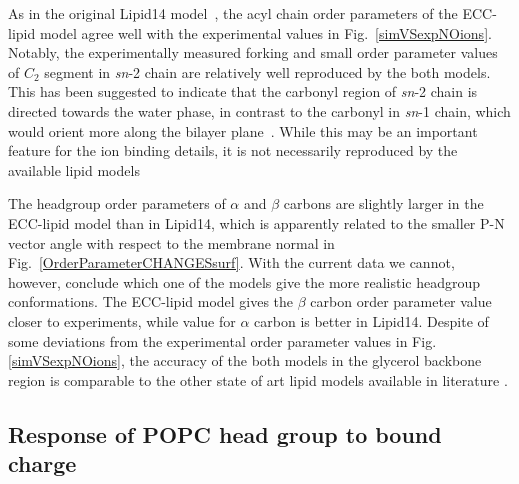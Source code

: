 \documentclass[aip,jcp,twocolumn]{revtex4}
\begin{document}
As in the original Lipid14 model~\cite{dickson14}, the acyl chain order parameters of the
ECC-lipid model agree well with the experimental values in Fig.~\ref{simVSexpNOions}. Notably, the experimentally measured forking and
small order parameter values of $C_2$ segment in {\it sn}-2 chain are relatively well
reproduced by the both models. This has been suggested to indicate that the carbonyl
region of {\it sn}-2 chain is directed towards the water phase, in contrast to the
carbonyl in {\it sn}-1 chain, which would orient more along the bilayer
plane~\cite{seelig75,schindler75,gawrisch92}. While this may be an important
feature for the ion binding details, it is not necessarily reproduced by the
available lipid models~\cite{ollila16}

The headgroup order parameters of $\alpha$ and $\beta$ carbons are slightly larger
in the ECC-lipid model than in Lipid14, which is apparently related to the
smaller P-N vector angle with respect to the membrane normal in
Fig.~\ref{OrderParameterCHANGESsurf}. With the current data we cannot,
however, conclude which one of the models give the more realistic
headgroup conformations. The ECC-lipid model gives
the $\beta$ carbon order parameter value closer to experiments, while
value for $\alpha$ carbon is better in Lipid14.
Despite of some deviations from the experimental order parameter values
in Fig. \ref{simVSexpNOions},
the accuracy of the both models in the glycerol backbone region
is comparable to the other state
of art lipid models available in literature \cite{botan15}.



\subsection{Response of POPC head group to bound charge}
\end{document}
